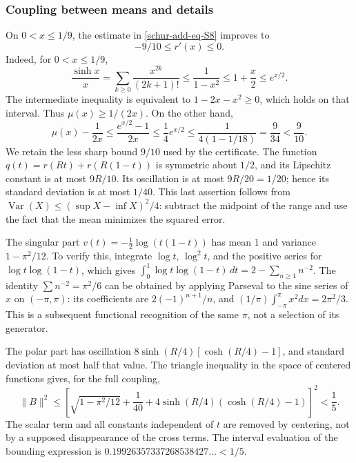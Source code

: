 \subsubsection{Coupling between means and details}
\label{schur-add-sub-295}

On \(0<x\leq1/9\), the estimate in \eqref{schur-add-eq-S8} improves to
\begin{equation}
-9/10\leq r'(x)\leq0.
\label{schur-add-display-25}
\end{equation}
Indeed, for \(0<x\leq1/9\),
\begin{equation}
\frac{\sinh x}{x}
=\sum_{k\geq0}\frac{x^{2k}}{(2k+1)!}
\leq\frac1{1-x^2}\leq1+\frac x2\leq e^{x/2}.
\label{schur-add-display-26}
\end{equation}
The intermediate inequality is equivalent to \(1-2x-x^2\geq0\),
which holds on that interval. Thus \(\mu(x)\geq1/(2x)\).
On the other hand,
\begin{equation}
\mu(x)-\frac1{2x}\leq\frac{e^{x/2}-1}{2x}
\leq\frac14 e^{x/2}
\leq\frac1{4(1-1/18)}=\frac9{34}<\frac9{10}.
\label{schur-add-display-27}
\end{equation}
We retain the less sharp bound \(9/10\) used by the certificate.
The function \(q(t)=r(Rt)+r(R(1-t))\) is symmetric about
\(1/2\), and its Lipschitz constant is at most \(9R/10\).
Its oscillation is at most \(9R/20=1/20\); hence its standard
deviation is at most \(1/40\). This last assertion follows from
\(\operatorname{Var}(X)\leq(\sup X-\inf X)^2/4\): subtract the
midpoint of the range and use the fact that the mean minimizes the squared error.

The singular part \(v(t)=-\tfrac12\log(t(1-t))\) has mean 1 and
variance \(1-\pi^2/12\). To verify this, integrate
\(\log t\), \(\log^2t\), and the positive series for
\(\log t\log(1-t)\), which gives
\(\int_0^1\log t\log(1-t)\,dt=2-\sum_{n\geq1}n^{-2}\).
The identity \(\sum n^{-2}=\pi^2/6\) can be obtained by applying Parseval
to the sine series of \(x\) on \((-\pi,\pi)\): its
coefficients are \(2(-1)^{n+1}/n\), and
\((1/\pi)\int_{-\pi}^{\pi}x^2dx=2\pi^2/3\). This is a subsequent
functional recognition of the same \(\pi\), not a selection of its generator.

The polar part has oscillation
\(8\sinh(R/4)[\cosh(R/4)-1]\), and standard deviation at most
half that value. The triangle inequality in the space of centered
functions gives, for the full coupling,
\begin{equation}
\boxed{\|B\|^2\leq
\left[\sqrt{1-\pi^2/12}+\frac1{40}
+4\sinh(R/4)(\cosh(R/4)-1)\right]^2<\frac15.}
\label{schur-add-eq-S12}
\end{equation}
The scalar term and all constants independent of \(t\)
are removed by centering, not by a supposed disappearance of the
cross terms. The interval evaluation of the bounding expression is
\(0.19926357337268538427\ldots<1/5\).

